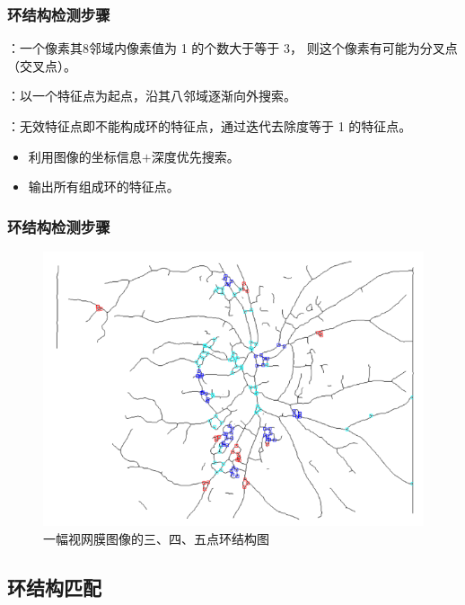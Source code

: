 \documentclass[notheorems,mathserif,table,compress]{beamer}  %
\begin{document}
 \begin{frame}
 \frametitle{环结构检测步骤}
{}：一个像素其8邻域内像素值为 1 的个数大于等于 3，
       则这个像素有可能为分叉点（交叉点）。

{}：以一个特征点为起点，沿其八邻域逐渐向外搜索。

{}：无效特征点即不能构成环的特征点，通过迭代去除度等于 1 的特征点。

{}%
\begin{itemize}
\item 利用图像的坐标信息$+$深度优先搜索。
\item 输出所有组成环的特征点。
\end{itemize}
\end{frame}

\begin{frame}
 \frametitle{环结构检测步骤}
\setlength{\fboxsep}{2pt}%
  \begin{figure}[ht!]
   \centering
  \includegraphics[width=0.4\linewidth]{345cycle.png}
  \caption{一幅视网膜图像的三、四、五点环结构图}
    \label{345cycle}
 \end{figure}
\end{frame}


\subsection{环结构匹配}
\end{document}
